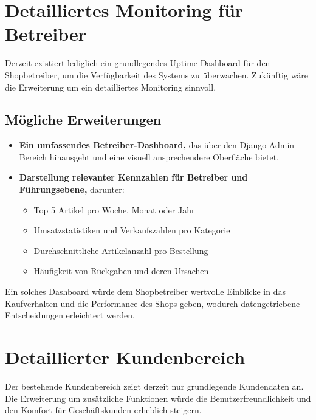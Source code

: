 \documentclass[%
	12pt,
	a4paper,
	oneside,
	parskip=full
]{scrbook}
\begin{document}
\section{Detailliertes Monitoring für Betreiber}

Derzeit existiert lediglich ein grundlegendes Uptime-Dashboard für den Shopbetreiber, um die Verfügbarkeit des Systems zu überwachen. Zukünftig wäre die Erweiterung um ein detailliertes Monitoring sinnvoll.

\subsection{Mögliche Erweiterungen}
\begin{itemize}
	\item \textbf{Ein umfassendes Betreiber-Dashboard,} das über den Django-Admin-Bereich hinausgeht und eine visuell ansprechendere Oberfläche bietet.
	\item \textbf{Darstellung relevanter Kennzahlen für Betreiber und Führungsebene,} darunter:
	\begin{itemize}
		\item Top 5 Artikel pro Woche, Monat oder Jahr
		\item Umsatzstatistiken und Verkaufszahlen pro Kategorie
		\item Durchschnittliche Artikelanzahl pro Bestellung
		\item Häufigkeit von Rückgaben und deren Ursachen
	\end{itemize}
\end{itemize}

Ein solches Dashboard würde dem Shopbetreiber wertvolle Einblicke in das Kaufverhalten und die Performance des Shops geben, wodurch datengetriebene Entscheidungen erleichtert werden.

\section{Detaillierter Kundenbereich}

Der bestehende Kundenbereich zeigt derzeit nur grundlegende Kundendaten an. Die Erweiterung um zusätzliche Funktionen würde die Benutzerfreundlichkeit und den Komfort für Geschäftskunden erheblich steigern.
\end{document}
